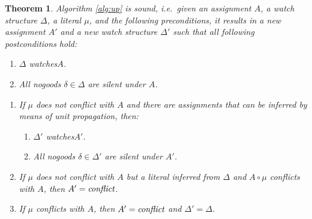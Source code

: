 \documentclass{vutinfth} %
\newtheorem{theorem}{Theorem}[section]
\newcommand{\ass}{A}
\newcommand{\lowinv}{watches\xspace}
\newcommand{\sgl}{\mu}
\begin{document}
\begin{theorem}
Algorithm \ref{alg:up} is sound, i.e.~given an assignment $\ass$, a watch structure $\Delta$, a literal $\sgl$, and the following preconditions, it results in a new assignment $\ass'$ and a new watch structure $\Delta'$ such that all following postconditions hold:

\begin{enumerate}[label={\normalfont (\textsc{Pre}\arabic*)},ref=(\textsc{Pre}\arabic*)]
\item $\Delta$ \lowinv $A$. \label{up:sound:pre2}
\item All nogoods $\delta \in \Delta$ are silent under $\ass$. \label{up:sound:pre1}
\end{enumerate}

\begin{enumerate}[label={\normalfont (\textsc{Post}\arabic*)},ref=(\textsc{Post}\arabic*)]
\item If $\sgl$ does not conflict with $\ass$ and there are assignments that can be inferred by means of unit propagation, then: \label{up:sound:post2}
\begin{enumerate}[label={\normalfont (\alph*)},ref=\theenumi(\alph*)]
\item $\Delta'$ \lowinv $\ass'$. \label{up:sound:post2b}
\item All nogoods $\delta \in \Delta'$ are silent under $\ass'$. \label{up:sound:post2a}
\end{enumerate}
\item If $\sgl$ does not conflict with $\ass$ but a literal inferred from $\Delta$ and $\ass \circ \sgl$ conflicts with $\ass$, then $\ass' = \emph{conflict}$. \label{up:sound:post3}
\item If $\sgl$ conflicts with $\ass$, then $\ass' = \emph{conflict}$ and $\Delta' = \Delta$. \label{up:sound:post1}%
\end{enumerate}
\end{theorem}
\end{document}
